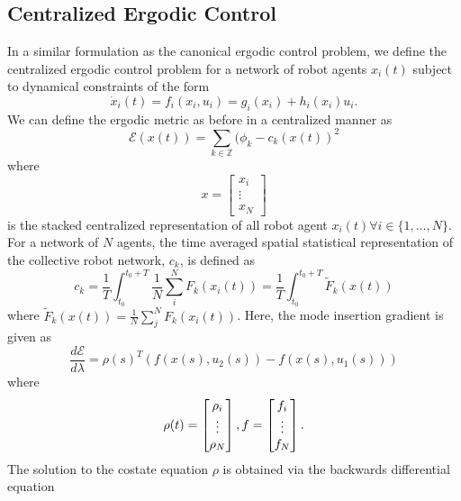 \documentclass[letterpaper, 10 pt,  conference, twoside]{IEEEtran/IEEEtran}
\theoremstyle{definition}
\begin{document}
\subsection{Centralized Ergodic Control}
In a similar formulation as the canonical ergodic control problem, we define the centralized ergodic control problem for a network of robot agents $x_i(t)$ subject to dynamical constraints of the form
\begin{equation*}
\dot{x}_i(t) = f_i(x_i , u_i) = g_i(x_i) + h_i(x_i)u_i .
\end{equation*}
We can define the ergodic metric as before in a centralized manner as
\begin{equation}\label{eq:cerg}
\mathcal{E} (x (t)) = \sum_{k \in \mathbb{Z}} (\phi_k - c_k (x (t))^2
\end{equation}
where
\begin{equation*}
x =
\begin{bmatrix}
x_i \\
\vdots \\
x_N
\end{bmatrix}
\end{equation*}
is the stacked centralized representation of all robot agent $x_i (t) \forall i \in \{1, \ldots, N \}$. For a network of $N$ agents, the time averaged spatial statistical representation of the collective robot network, $c_k$, is defined as
\begin{equation} \label{eq:ckn}
c_k = \frac{1}{T} \int_{t_0}^{t_0 + T} \frac{1}{N} \sum_i^N F_k(x_i(t)) = \frac{1}{T} \int_{t_0}^{t_0+T} \tilde{F}_k(x(t))
\end{equation}
where $\tilde{F}_k(x(t)) = \frac{1}{N} \sum_j^N F_k(x_i(t))$. Here, the mode insertion gradient is given as
\begin{equation*}
\frac{d \mathcal{E}}{d\lambda} = \rho(s)^T (f(x(s), u_2(s)) - f(x(s),u_1(s)))
\end{equation*}
where
\begin{equation*}
\bold{\rho}(t) =
\begin{bmatrix}
\rho_i \\
\vdots \\
\rho_N
\end{bmatrix} ,
f =
\begin{bmatrix}
f_i \\
\vdots \\
f_N
\end{bmatrix} .
\end{equation*}
The solution to the costate equation $\rho$ is obtained via the backwards differential equation
\end{document}
